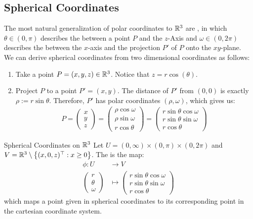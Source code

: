 \subsection{Spherical Coordinates}
The most natural generalization of polar coordinates to $\mathbb{R}^3$ are , in which $\theta \in (0,\pi)$ describes the  between a point $P$ and the $z$-Axis and $\omega \in (0,2\pi)$ describes the  between the $x$-axis and the projection $P'$ of $P$ onto the $xy$-plane.
We can derive spherical coordinates from two dimensional coordinates as follows:
\begin{enumerate}
	\item Take a point $P = (x,y,z) \in \mathbb{R}^3$. Notice that $z = r\cos(\theta)$.
	\item Project $P$ to a point $P' = (x,y)$. The distance of $P'$ from $(0,0)$ is exactly $\rho := r \sin \theta$. Therefore, $P'$ has polar coordinates $(\rho, \omega)$, which gives us:
	\begin{align*}
		P = 
		\begin{pmatrix}
			x\\
			y\\
			z
		\end{pmatrix}
		=
		\begin{pmatrix}
			\rho \cos \omega\\
			\rho \sin \omega\\
			r \cos \theta
		\end{pmatrix}
		=
		\begin{pmatrix}
			r \sin \theta \cos \omega\\
			r \sin \theta \sin \omega\\
			r \cos \theta
		\end{pmatrix}
	\end{align*}
\end{enumerate}
\begin{importantdefinition}{Spherical Coordinates on $\mathbb{R}^3$}{}
	Let $U = (0,\infty) \times (0,\pi) \times (0, 2\pi)$ and $V = \mathbb{R}^3 \setminus \qty{(x,0,z)^\top : x \geq 0}$. The  is the map:
	\begin{align*}
		\phi : 
		U &\to V\\
		\begin{pmatrix}
			r\\
			\theta\\
			\omega
		\end{pmatrix}
		&\mapsto
		\begin{pmatrix}
			r \sin \theta \cos \omega\\
			r \sin \theta \sin \omega\\
			r \cos \theta
		\end{pmatrix}
	\end{align*}
	which maps a point given in spherical coordinates to its corresponding point in the cartesian coordinate system. 
\end{importantdefinition}
